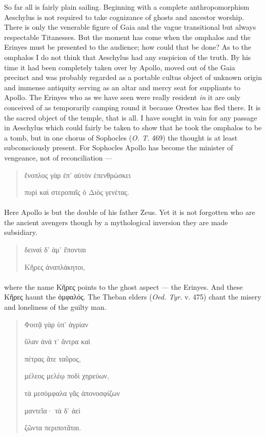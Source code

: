 \documentclass[a4paper, 11pt, oneside, polutonikogreek, english]{article}
\begin{document}
So far all is fairly plain sailing. Beginning with a complete anthropomorphism Aeschylus is not required to take cognizance of ghosts and ancestor worship. There is only the venerable figure of Gaia and the vague transitional but always respectable Titanesses. But the moment has come when the omphalos and the Erinyes must be presented to the audience; how could that be done? As to the omphalos I do not think that Aeschylus had any suspicion of the truth. By his time it had been completely taken over by Apollo, moved out of the Gaia precinct and was probably regarded as a portable cultus object of unknown origin and immense antiquity serving as an altar and mercy seat for suppliants to Apollo. The Erinyes who as we have seen were really resident \emph{in} it are only conceived of as temporarily camping round it because Orestes has fled there. It is the sacred object of the temple, that is all. I have sought in vain for any passage in Aeschylus which could fairly be taken to show that he took the omphalos to be a tomb, but in one chorus of Sophocles (\emph{O. T.} 469) the thought is at least subconsciously present. For Sophocles Apollo has become the minister of vengeance, not of reconciliation ---
\begin{quotation}
ἔνοπλος γὰρ ἐπ' αὐτὸν ἐπενθρώσκει

πυρὶ καὶ στεροπαῖς ὁ Διὸς γενέτας.
\end{quotation}
\paragraph{}
Here Apollo is but the double of his father Zeus. Yet it is not forgotten who are the ancient avengers though by a mythological inversion they are made subsidiary.
\begin{quotation}
δειναὶ δ' ἁμ' ἕπονται

Κῆρες ἀναπλάκητοι,
\end{quotation}
\paragraph{}
where the name Κῆρες points to the ghost aspect --- the Erinyes. And these Κῆρες haunt the ὀμφαλός. The Theban elders (\emph{Oed. Tyr.} v. 475) chant the misery and loneliness of the guilty man.
\begin{quotation}
Φοιτᾷ γὰρ ὑπ' ἀγρίαν

ὕλαν ἀνά τ' ἄντρα καὶ

πέτρας ἅτε ταῦρος,

μέλεος μελέῳ ποδὶ χηρεύων,

τὰ μεσόμφαλα γᾶς ἀπονοσφίζων

μαντεῖα· τὰ δ' ἀεὶ

ζῶντα περιποτᾶται.
\end{quotation}
\end{document}
